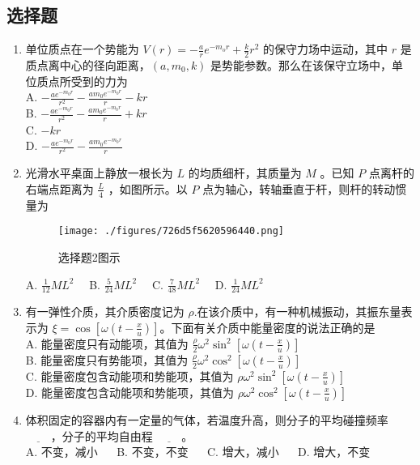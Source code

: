 

\subsection{选择题}
\begin{enumerate}
\item 单位质点在一个势能为 $V(r) = -\frac{a}{r}e^{-m_{o}r}+\frac{k}{2}r^{2}$ 的保守力场中运动，其中 $r$ 是质点离中心的径向距离，$(a,m_{0},k)$ 是势能参数。那么在该保守立场中，单位质点所受到的力为\\
A. $-\frac{ae^{-m_{0}r}}{r^{2}}-\frac{am_{0}e^{-m_{0}r}}{r}-kr$\\
B. $-\frac{ae^{-m_{0}r}}{r^{2}}-\frac{am_{0}e^{-m_{0}r}}{r}+kr$\\
C. $-kr$\\
D. $-\frac{ae^{-m_{0}r}}{r^{2}}-\frac{am_{0}e^{-m_{0}r}}{r}$\\

\item 光滑水平桌面上静放一根长为 $L$ 的均质细杆，其质量为 $M$ 。已知 $P$ 点离杆的右端点距离为 $\frac{L}{4}$ ，如图所示。以 $P$ 点为轴心，转轴垂直于杆，则杆的转动惯量为\\
\begin{figure}[ht]
\centering
\texttt{[image: ./figures/726d5f5620596440.png]}
\caption{选择题2图示} \label{fig_CAS17_1}
\end{figure}
A. $\frac{1}{12}ML^{2} \quad$
B. $\frac{5}{24}ML^{2} \quad$
C. $\frac{7}{48}ML^{2} \quad$
D. $\frac{1}{24}ML^{2} \quad$

\item 有一弹性介质，其介质密度记为 $\rho$.在该介质中，有一种机械振动，其振东量表示为 $\xi = \cos{[\omega(t-\frac{x}{u})]}$。下面有关介质中能量密度的说法正确的是\\
A. 能量密度只有动能项，其值为 $\frac{\rho}{2}\omega^{2}\sin^{2}{[\omega(t-\frac{x}{u})]}$\\
B. 能量密度只有势能项，其值为 $\frac{\rho}{2}\omega^{2}\cos^{2}{[\omega(t-\frac{x}{u})]}$\\
C. 能量密度包含动能项和势能项，其值为 $\rho\omega^{2}\sin^{2}{[\omega(t-\frac{x}{u})]}$\\
D. 能量密度包含动能项和势能项，其值为 $\rho\omega^{2}\cos^{2}{[\omega(t-\frac{x}{u})]}$\\

\item 体积固定的容器内有一定量的气体，若温度升高，则分子的平均碰撞频率 $\underline{~~~~~~~~~~}$，分子的平均自由程 $\underline{~~~~~~~~~~}$。\\
A. 不变，减小 $\quad$
B. 不变，不变 $\quad$
C. 增大，减小 $\quad$
D. 增大，不变 $\quad$


\end{enumerate}
